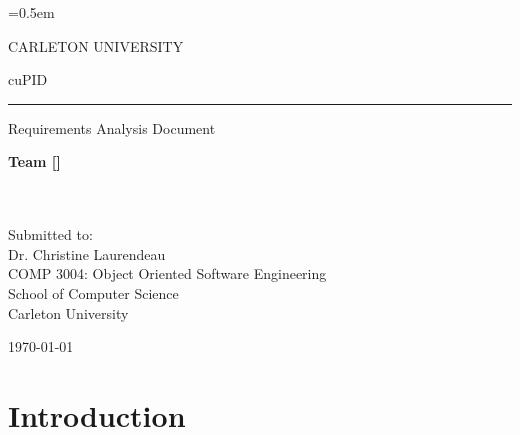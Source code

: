 \documentclass[12pt,letterpaper]{article}
\begin{document}
\everyrow{\hline}
\tabulinesep=0.5em
\setlength\extrarowheight{0.5em}

\newcommand{\ccindent}{\hspace{1.5em}\hangindent=1.5em}
\newcommand{\tableheader}{\rowfont\bf\rowcolor{thcolor!30}}

\thispagestyle{empty}

\begin{center}
	CARLETON UNIVERSITY
\end{center}

\vfill

\begin{center}
	{\fontsize{55pt}{55pt}\selectfont cuPID}
	\vspace{0.5em}\rule{\textwidth}{0.5pt}
	Requirements Analysis Document
\end{center}

\vspace{5em}

\begin{center}
	\textbf{Team [\teamname{}]}\\
	\personone{}\\
	\persontwo{}\\
	\personthree{}
\end{center}

\vfill

\begin{center}
	Submitted to:\\
	Dr. Christine Laurendeau\\
	COMP 3004: Object Oriented Software Engineering\\
	School of Computer Science\\
	Carleton University
\end{center}

\vspace{2em}

\begin{center}
	\today
\end{center}

\newpage{}

\tableofcontents{}

\renewcommand{\listfigurename}{Figures}
\listoffigures

\renewcommand{\listtablename}{Tables}
\listoftables

\newpage{}

\section{Introduction}
\end{document}
